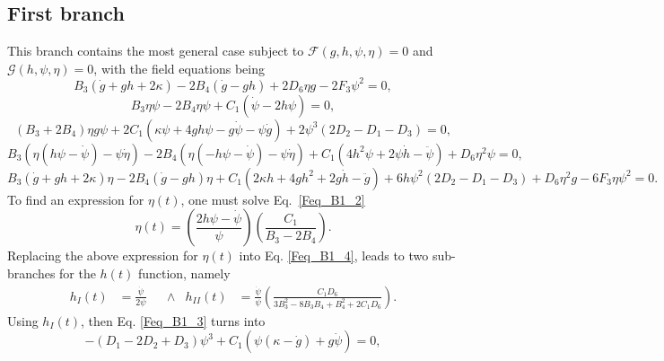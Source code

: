 \documentclass[epj]{svjour}
\begin{document}
\subsection{First branch}
\label{sec:first_branch}

This branch contains the most general case subject to $\mathcal{F}(g,h,\psi,\eta) = 0$ and $\mathcal{G}(h,\psi,\eta) = 0$, with the field equations being
\begin{dmath}
    \label{Feq_B1_1}
    B_3\left(\dot{g} + gh + 2\kappa\right) - 2B_4\left(\dot{g} - gh\right) + 2D_6\eta g - 2F_3\psi^2 = 0,
\end{dmath}
\begin{dmath}
    \label{Feq_B1_2}
    B_3\eta\psi -2B_4\eta\psi + C_1\left(\dot{\psi} - 2h\psi\right) = 0,
\end{dmath}
\begin{dmath}
    \label{Feq_B1_3}
    \left(B_3 + 2B_4\right)\eta g\psi + 2C_1\left(\kappa\psi + 4gh\psi - g\dot{\psi} - \psi\dot{g}\right) + 2\psi^3\left(2D_2 - D_1 - D_3\right) = 0,
\end{dmath}
\begin{dmath}
    \label{Feq_B1_4}
    B_3\left(\eta\left(h\psi - \dot{\psi}\right) -\psi\dot{\eta}\right) - 2B_4\left(\eta\left(-h\psi - \dot{\psi}\right) -\psi\dot{\eta}\right) 
    + C_1\left(4h^2\psi + 2\psi\dot{h} -\ddot{\psi}\right) + D_6\eta^2\psi = 0,
\end{dmath}
\begin{dmath}
    \label{Feq_B1_5}
    B_3\left(\dot{g} + gh + 2\kappa\right)\eta - 2B_4\left(\dot{g} - gh\right)\eta + C_1\left(2\kappa h + 4gh^2 + 2g\dot{h} - \ddot{g}\right) +
    6h\psi^2\left(2D_2 - D_1 - D_3\right) + D_6 \eta^2 g - 6F_3\eta\psi^2 = 0.
\end{dmath}
To find an expression for $\eta(t)$, one must solve Eq.~\eqref{Feq_B1_2} 
\begin{equation}
    \label{B1_eta}
    \eta(t) = \left(\frac{2h\psi - \dot{\psi}}{\psi}\right)\left(\frac{C_1}{B_3 - 2B_4}\right).
\end{equation}
Replacing the above expression for $\eta(t)$ into Eq. \eqref{Feq_B1_4}, leads to two sub-branches for the $h(t)$ function, namely
\begin{align}
    \label{B1_h}
    h_I(t) & = \frac{\dot{\psi}}{2\psi} & & \wedge &  h_{II}(t) & = \frac{\dot{\psi}}{\psi}\left(\frac{C_1 D_6}{3B_3^2 - 8B_3B_4 + B_4^2 + 2C_1D_6}\right).
\end{align}
Using $h_I(t)$, then Eq. \eqref{Feq_B1_3} turns into
\begin{equation}
    -\left(D_1 - 2D_2 + D_3\right)\psi^3 + C_1\left(\psi\left(\kappa - \dot{g}\right) + g\dot{\psi}\right) = 0,
\end{equation}
\end{document}

